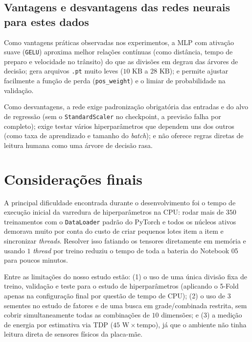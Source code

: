 \documentclass[12pt,a4paper]{article}
\begin{document}
\subsection{Vantagens e desvantagens das redes neurais para estes dados}

Como vantagens práticas observadas nos experimentos, a MLP com ativação suave (\texttt{GELU}) aproxima melhor relações contínuas (como distância, tempo de preparo e velocidade no trânsito) do que as divisões em degrau das árvores de decisão; gera arquivos \texttt{.pt} muito leves ($10\text{ KB}$ a $28\text{ KB}$); e permite ajustar facilmente a função de perda (\texttt{pos\_weight}) e o limiar de probabilidade na validação.

Como desvantagens, a rede exige padronização obrigatória das entradas e do alvo de regressão (sem o \texttt{StandardScaler} no checkpoint, a previsão falha por completo); exige testar vários hiperparâmetros que dependem uns dos outros (como taxa de aprendizado e tamanho do \textit{batch}); e não oferece regras diretas de leitura humana como uma árvore de decisão rasa.

\section{Considerações finais}

A principal dificuldade encontrada durante o desenvolvimento foi o tempo de execução inicial da varredura de hiperparâmetros na CPU: rodar mais de $350$ treinamentos com o \texttt{DataLoader} padrão do PyTorch e todos os núcleos ativos demorava muito por conta do custo de criar pequenos lotes item a item e sincronizar \textit{threads}. Resolver isso fatiando os tensores diretamente em memória e usando $1$ \textit{thread} por treino reduziu o tempo de toda a bateria do Notebook 05 para poucos minutos.

Entre as limitações do nosso estudo estão: (1) o uso de uma única divisão fixa de treino, validação e teste para o estudo de hiperparâmetros (aplicando o 5-Fold apenas na configuração final por questão de tempo de CPU); (2) o uso de $3$ sementes no estudo de fatores e de uma busca em grade/combinada restrita, sem cobrir simultaneamente todas as combinações de $10$ dimensões; e (3) a medição de energia por estimativa via TDP ($45\text{ W} \times \text{tempo}$), já que o ambiente não tinha leitura direta de sensores físicos da placa-mãe.
\end{document}
